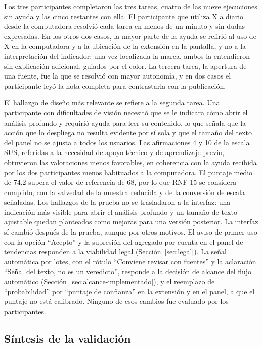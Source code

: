 Los tres participantes completaron las tres tareas, cuatro de las nueve ejecuciones sin ayuda y las cinco restantes con ella. El participante que utiliza X a diario desde la computadora resolvió cada tarea en menos de un minuto y sin dudas expresadas. En los otros dos casos, la mayor parte de la ayuda se refirió al uso de X en la computadora y a la ubicación de la extensión en la pantalla, y no a la interpretación del indicador: una vez localizada la marca, ambos la entendieron sin explicación adicional, guiados por el color. La tercera tarea, la apertura de una fuente, fue la que se resolvió con mayor autonomía, y en dos casos el participante leyó la nota completa para contrastarla con la publicación.

El hallazgo de diseño más relevante se refiere a la segunda tarea. Una participante con dificultades de visión necesitó que se le indicara cómo abrir el análisis profundo y requirió ayuda para leer su contenido, lo que señala que la acción que lo despliega no resulta evidente por sí sola y que el tamaño del texto del panel no se ajusta a todos los usuarios. Las afirmaciones 4 y 10 de la escala SUS, referidas a la necesidad de apoyo técnico y de aprendizaje previo, obtuvieron las valoraciones menos favorables, en coherencia con la ayuda recibida por los dos participantes menos habituados a la computadora. El puntaje medio de 74,2 supera el valor de referencia de 68, por lo que RNF-15 se considera cumplido, con la salvedad de la muestra reducida y de la conversión de escala señaladas. Los hallazgos de la prueba no se trasladaron a la interfaz: una indicación más visible para abrir el análisis profundo y un tamaño de texto ajustable quedan planteados como mejoras para una versión posterior. La interfaz sí cambió después de la prueba, aunque por otros motivos. El aviso de primer uso con la opción \enquote{Acepto} y la supresión del agregado por cuenta en el panel de tendencias responden a la viabilidad legal (Sección~\ref{sec:legal}). La señal automática por lotes, con el rótulo \enquote{Conviene revisar con fuentes} y la aclaración \enquote{Señal del texto, no es un veredicto}, responde a la decisión de alcance del flujo automático (Sección~\ref{sec:alcance-implementado}), y el reemplazo de \enquote{probabilidad} por \enquote{puntaje de confianza} en la extensión y en el panel, a que el puntaje no está calibrado. Ninguno de esos cambios fue evaluado por los participantes.

\FloatBarrier
\subsection{Síntesis de la validación}
\label{sec:sintesis-validacion}

